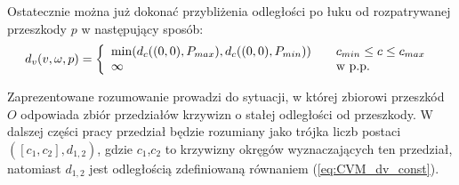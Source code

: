 	Ostatecznie można już dokonać przybliżenia odległości po łuku od rozpatrywanej przeszkody $p$ w następujący sposób:
	\begin{equation}\label{eq:CVM_dv_const}
	d_v(v,\omega,p)= \left\{ 
	\begin{array}{l l}
  	\min(d_c((0,0),P_{max}),d_c((0,0),P_{min})) & \quad \mbox{$c_{min}\leq c \leq c_{max}$  }\\
  	\infty & \quad \mbox{w p.p. }\\
	\end{array} \right. 
	\end{equation}

	Zaprezentowane rozumowanie prowadzi do sytuacji, w której zbiorowi przeszkód $O$ odpowiada zbiór przedziałów krzywizn o stałej odległości od przeszkody.
	W dalszej części pracy przedział będzie rozumiany jako trójka liczb postaci $([c_1,c_2],d_{1,2})$, gdzie $c_1$,$c_2$ to krzywizny okręgów wyznaczających ten przedział,
	natomiast $d_{1,2}$ jest odległością zdefiniowaną równaniem (\ref{eq:CVM_dv_const}).
	
